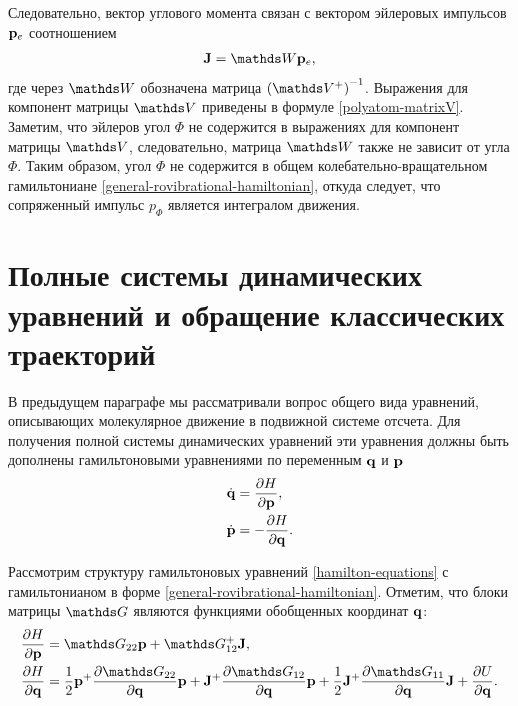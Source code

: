 Следовательно, вектор углового момента связан с вектором эйлеровых импульсов $\mathbf{p}_e$ соотношением
\begin{gather}
    \mf{J} = \bbW \pe, \label{polyatom-angular-momentum-euler-momenta}
\end{gather}
%
где через $\bbW$ обозначена матрица $\lb \bbV^{+} \rb^{-1}$. Выражения для компонент матрицы $\bbV$ приведены в формуле \eqref{polyatom-matrixV}. Заметим, что эйлеров угол $\Phi$ не содержится в выражениях для компонент матрицы $\bbV$, следовательно, матрица $\bbW$ также не зависит от угла $\Phi$. Таким образом, угол $\Phi$ не содержится в общем колебательно-вращательном гамильтониане \eqref{general-rovibrational-hamiltonian}, откуда следует, что сопряженный импульс $p_\Phi$ является интегралом движения. \par

\section{Полные системы динамических уравнений и обращение классических траекторий} \label{section:dynamic-equations}

В предыдущем параграфе мы рассматривали вопрос общего вида уравнений, описывающих молекулярное движение в подвижной системе отсчета. Для получения полной системы динамических уравнений эти уравнения должны быть дополнены гамильтоновыми уравнениями по переменным $\mathbf{q}$ и $\mathbf{p}$
\begin{gather}
    \begin{aligned}
        \dot{\mathbf{q}} &= \frac{\partial H}{\partial \mathbf{p}}, \\
        \dot{\mathbf{p}} &= -\frac{\partial H}{\partial \mathbf{q}}.
    \end{aligned} \label{hamilton-equations}
\end{gather}

Рассмотрим структуру гамильтоновых уравнений \eqref{hamilton-equations} с гамильтонианом в форме \eqref{general-rovibrational-hamiltonian}. Отметим, что блоки матрицы $\bbG$ являются функциями обобщенных координат $\mathbf{q}$:
\begin{gather}
    \begin{aligned}
        \frac{\partial H}{\partial \mf{p}} &= \bbG_{22} \mf{p} + \bbG_{12}^{+} \mf{J}, \\
        \frac{\partial H}{\partial \mf{q}} &= \frac{1}{2} \mf{p}^+ \frac{\partial \bbG_{22}}{\partial \mf{q}} \mf{p} + \mf{J}^+ \frac{\partial \bbG_{12}}{\partial \mf{q}} \mf{p} + \frac{1}{2} \mf{J}^+ \frac{\partial \bbG_{11}}{\partial \mf{q}} \mf{J} + \frac{\partial U}{\partial \mf{q}}.
    \end{aligned} \label{hamilton-equations1}
\end{gather}

